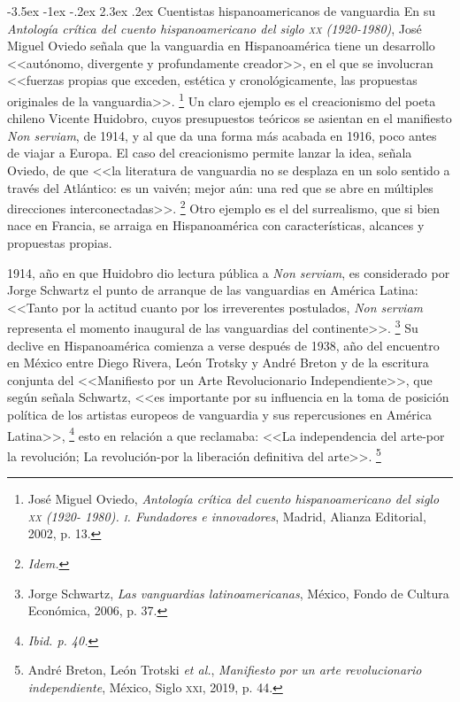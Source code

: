 \documentclass[14pt,twoside,final]{extbook} %
\makeatletter
\let\oldfootnote\footnote
\renewcommand\footnote[1]{%
\oldfootnote{\hspace{1mm}#1}}
\renewcommand\section{\@startsection {section}{1}{\z@}%
                                     {-3.5ex \@plus -1ex \@minus -.2ex}%
                                     {2.3ex \@plus .2ex}%
                                     {\normalfont\large\bfseries\sc}}
\makeatother
\begin{document}
\section{Cuentistas hispanoamericanos de vanguardia}\label{sec:cuentistas-hispanoamericanos-de-vanguardia}
En su \emph{Antología crítica del cuento hispanoamericano del siglo \textsc{xx} (1920-1980)}, José Miguel Oviedo señala que la vanguardia en Hispanoamérica tiene un desarrollo <<autónomo, divergente y profundamente creador>>, en el que se involucran <<fuerzas propias que exceden, estética y cronológicamente, las propuestas originales de la vanguardia>>.\footnote{José Miguel Oviedo, \emph{Antología crítica del cuento hispanoamericano del siglo \textsc{xx} (1920- 1980). \textsc{i}. Fundadores e innovadores}, Madrid, Alianza Editorial, 2002, p. 13.} Un claro ejemplo es el creacionismo del poeta chileno Vicente Huidobro, cuyos presupuestos teóricos se asientan en el manifiesto \emph{Non serviam}, de 1914, y al que da una forma más acabada en 1916, poco antes de viajar a Europa. El caso del creacionismo permite lanzar la idea, señala Oviedo, de que <<la literatura de vanguardia no se desplaza en un solo sentido a través del Atlántico: es un vaivén; mejor aún: una red que se abre en múltiples direcciones interconectadas>>.\footnote{\em Idem.} Otro ejemplo es el del surrealismo, que si bien nace en Francia, se arraiga en Hispanoamérica con características, alcances y propuestas propias.

1914, año en que Huidobro dio lectura pública a \emph{Non serviam}, es considerado
por Jorge Schwartz el punto de arranque de las vanguardias en América Latina: <<Tanto por la actitud cuanto por los irreverentes postulados, \emph{Non serviam} representa el momento inaugural de las vanguardias del continente>>.\footnote{Jorge Schwartz, \emph{Las vanguardias latinoamericanas}, México, Fondo de Cultura Económica, 2006, p. 37.} Su declive en Hispanoamérica comienza a verse después de 1938, año del encuentro en México entre Diego Rivera, León Trotsky y André Breton y de la escritura conjunta del <<Manifiesto por un Arte Revolucionario Independiente>>, que según señala Schwartz, <<es importante por su influencia en la toma de posición política de los artistas europeos de vanguardia y sus repercusiones en América Latina>>,\footnote{\em Ibid. p. 40.} esto en relación a que reclamaba: <<La independencia del arte-por la revolución; La revolución-por la liberación definitiva del arte>>.\footnote{André Breton, León Trotski \emph{et al.}, \emph{Manifiesto por un arte revolucionario independiente}, México, Siglo \textsc{xxi}, 2019, p. 44.}
\end{document}
